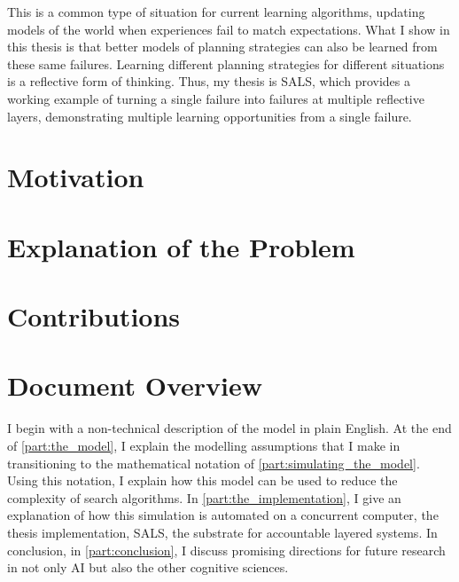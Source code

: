 This is a common type of situation for current learning algorithms,
updating models of the world when experiences fail to match
expectations.  What I show in this thesis is that better models of
planning strategies can also be learned from these same failures.
Learning different planning strategies for different situations is a
reflective form of thinking.  Thus, my thesis is SALS, which provides
a working example of turning a single failure into failures at
multiple reflective layers, demonstrating multiple learning
opportunities from a single failure.

\section{Motivation}

\section{Explanation of the Problem}

\section{Contributions}

\section{Document Overview}

I begin with a non-technical description of the model in plain
English.  At the end of \autoref{part:the_model}, I explain the
modelling assumptions that I make in transitioning to the mathematical
notation of \autoref{part:simulating_the_model}.  Using this notation,
I explain how this model can be used to reduce the complexity of
search algorithms.  In \autoref{part:the_implementation}, I give an
explanation of how this simulation is automated on a concurrent
computer, the thesis implementation, SALS, the substrate for
accountable layered systems.  In conclusion, in
\autoref{part:conclusion}, I discuss promising directions for future
research in not only AI but also the other cognitive sciences.






